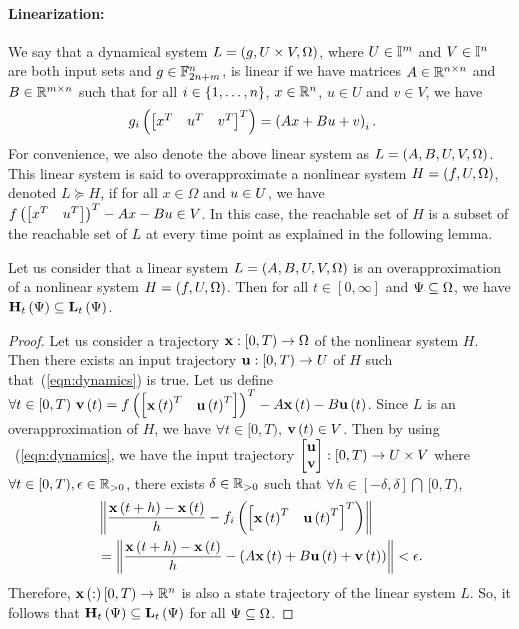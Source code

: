 \paragraph{Linearization:}  We say that a dynamical system
$L = \left(g,U\times V,\Omega\right)$, where $U\in\mathbb{I}^m$ and
$V\in\mathbb{I}^n$ are both input sets and $g\in\mathbb{F}_{2n+m}^n$, is
linear if we have matrices $A\in\mathbb{R}^{n\times n}$ and
$B\in\mathbb{R}^{m\times n}$ such that for all $i\in\left\{1,\ldots,n\right\}$,
$x\in\mathbb{R}^n$, $u\in U$ and $v\in V$, we have
%
\begin{align*}
& g_i\left(\begin{bmatrix}x^T & u^T & v^T\end{bmatrix}^T\right) = \left(Ax + Bu + v\right)_i.
\end{align*}
%
For convenience, we also denote the above linear system as $L
= \left(A,B,U,V,\Omega\right)$.  This linear system is said to overapproximate
a nonlinear system $H = \left(f,{U},\Omega\right)$, denoted $L\succeq H$,
if for all $x\in\Omega$ and $u\in{U}$, we have $f\left(\begin{bmatrix}x^T
& u^T\end{bmatrix}\right)^T - Ax - Bu \in V$.  In this case, the reachable set of $H$ is
a subset of the reachable set of $L$ at every time point as explained
in the following lemma.
%
\begin{lemma}\label{lem:inclin}
Let us consider that a linear system $L = \left(A,B,U,V,\Omega\right)$ is an
overapproximation of a nonlinear system $H = \left(f,U,\Omega\right)$.  Then
for all $t\in[0,\infty]$ and $\Psi\subseteq\Omega$, we have
$\mathbf{H}_{t}\left(\Psi\right)\subseteq \mathbf{L}_{t}\left(\Psi\right)$.
\end{lemma}
%
\begin{proof}
Let us consider a trajectory $\mathbf{x}:[0,T)\rightarrow\Omega$ of the
nonlinear system $H$.  Then there exists an input trajectory
$\mathbf{u}:[0,T)\rightarrow U$ of $H$ such that~(\ref{eqn:dynamics}) is
true.  Let us define $\forall t\in[0,T)~\mathbf{v}\left(t\right) =
f\left(\begin{bmatrix}\mathbf{x}\left(t\right)^T & \mathbf{u}\left(t\right)^T\end{bmatrix}\right)^T - A\mathbf{x}\left(t\right) -
B\mathbf{u}\left(t\right)$.  Since $L$ is an overapproximation of $H$, we have
$\forall t\in[0,T)$, $\mathbf{v}\left(t\right)\in V$.  Then by using
~(\ref{eqn:dynamics}, we have the input trajectory
$\begin{bmatrix}\mathbf{u} \\ \mathbf{v}\end{bmatrix}:[0,T)\rightarrow U\times V$ where
$\forall t\in[0,T), \epsilon\in\mathbb{R}_{>0}$, there exists
$\delta\in\mathbb{R}_{>0}$ such that $\forall
h\in[-\delta,\delta]\bigcap\, [0,T)$,
%
\begin{align*}
& \left\| \frac{ \mathbf{x}\left(t+h\right) - \mathbf{x}\left(t\right) }{h} -
f_i\left( \begin{bmatrix} \mathbf{x}\left(t\right)^T & \mathbf{u}\left(t\right)^T \end{bmatrix}^T \right)\right\|\\
& = \left\| \frac{ \mathbf{x}\left(t+h\right) - \mathbf{x}\left(t\right) }{h} -
\left(A\mathbf{x}\left(t\right) + B\mathbf{u}\left(t\right) + \mathbf{v}\left(t\right)\right) \right\| < \epsilon.
\end{align*}
%
Therefore, $\mathbf{x}\left(:\right)[0,T)\rightarrow \mathbb{R}^n$ is also a state
trajectory of the linear system $L$.  So, it follows that
$\mathbf{H}_{t}\left(\Psi\right)\subseteq \mathbf{L}_{t}\left(\Psi\right)$ for all
$\Psi\subseteq \Omega$.
\end{proof}
